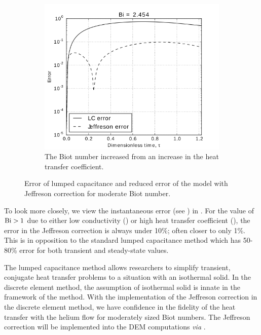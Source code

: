 \begin{figure}
        \begin{subfigure}[b]{0.5\textwidth}
                \includegraphics[width=\textwidth]{figures/LC-JC-analytic-error-Bi-2b}
                \caption{The Biot number increased from  an increase in the heat transfer coefficient.}
				\label{fig:LC-JC-analytic-error-Bi-2b}
        \end{subfigure}
        \caption[Error of lumped capacitance and Jeffreson correction for moderate Biot number]{Error of lumped capacitance and reduced error of the model with Jeffreson correction for moderate Biot number.}\label{fig:LC-JC-analytic-error-Bi-2}
\end{figure}

To look more closely, we view the instantaneous error (see ) in . For the value of $\mathrm{Bi} > 1$ due to either low conductivity () or high heat transfer coefficient (), the error in the Jeffreson correction is always under 10\%; often closer to only 1\%. This is in opposition to the standard lumped capacitance method which has 50-80\% error for both transient and steady-state values.

The lumped capacitance method allows researchers to simplify transient, conjugate heat transfer problems to a situation with an isothermal solid. In the discrete element method, the assumption of isothermal solid is innate in the framework of the method. With the implementation of the Jeffreson correction in the discrete element method, we have confidence in the fidelity of the heat transfer with the helium flow for moderately sized Biot numbers. The Jeffreson correction will be implemented into the DEM computations \textit{via} . 







